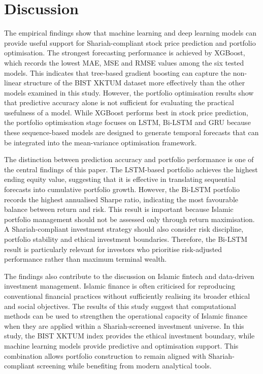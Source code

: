 \section{Discussion}

The empirical findings show that machine learning and deep learning models can provide useful support for Shariah-compliant stock price prediction and portfolio optimisation. The strongest forecasting performance is achieved by XGBoost, which records the lowest MAE, MSE and RMSE values among the six tested models. This indicates that tree-based gradient boosting can capture the non-linear structure of the BIST XKTUM dataset more effectively than the other models examined in this study. However, the portfolio optimisation results show that predictive accuracy alone is not sufficient for evaluating the practical usefulness of a model. While XGBoost performs best in stock price prediction, the portfolio optimisation stage focuses on LSTM, Bi-LSTM and GRU because these sequence-based models are designed to generate temporal forecasts that can be integrated into the mean-variance optimisation framework.

The distinction between prediction accuracy and portfolio performance is one of the central findings of this paper. The LSTM-based portfolio achieves the highest ending equity value, suggesting that it is effective in translating sequential forecasts into cumulative portfolio growth. However, the Bi-LSTM portfolio records the highest annualised Sharpe ratio, indicating the most favourable balance between return and risk. This result is important because Islamic portfolio management should not be assessed only through return maximisation. A Shariah-compliant investment strategy should also consider risk discipline, portfolio stability and ethical investment boundaries. Therefore, the Bi-LSTM result is particularly relevant for investors who prioritise risk-adjusted performance rather than maximum terminal wealth.

The findings also contribute to the discussion on Islamic fintech and data-driven investment management. Islamic finance is often criticised for reproducing conventional financial practices without sufficiently realising its broader ethical and social objectives. The results of this study suggest that computational methods can be used to strengthen the operational capacity of Islamic finance when they are applied within a Shariah-screened investment universe. In this study, the BIST XKTUM index provides the ethical investment boundary, while machine learning models provide predictive and optimisation support. This combination allows portfolio construction to remain aligned with Shariah-compliant screening while benefiting from modern analytical tools.

